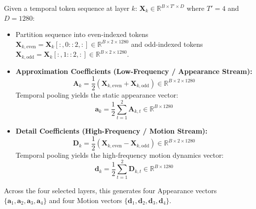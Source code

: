 \documentclass[a4paper, 11pt]{article}
\begin{document}
Given a temporal token sequence at layer $k$: $\mathbf{X}_k \in \mathbb{R}^{B \times T' \times D}$ where $T'=4$ and $D=1280$:
\begin{itemize}
    \item Partition sequence into even-indexed tokens $\mathbf{X}_{k, \text{even}} = \mathbf{X}_k[:, 0::2, :] \in \mathbb{R}^{B \times 2 \times 1280}$ and odd-indexed tokens $\mathbf{X}_{k, \text{odd}} = \mathbf{X}_k[:, 1::2, :] \in \mathbb{R}^{B \times 2 \times 1280}$.
    \item \textbf{Approximation Coefficients (Low-Frequency / Appearance Stream):}
    \begin{equation}
        \mathbf{A}_k = \frac{1}{2}(\mathbf{X}_{k, \text{even}} + \mathbf{X}_{k, \text{odd}}) \in \mathbb{R}^{B \times 2 \times 1280}
    \end{equation}
    Temporal pooling yields the static appearance vector:
    \begin{equation}
        \mathbf{a}_k = \frac{1}{2} \sum_{t=1}^{2} \mathbf{A}_{k, t} \in \mathbb{R}^{B \times 1280}
    \end{equation}
    \item \textbf{Detail Coefficients (High-Frequency / Motion Stream):}
    \begin{equation}
        \mathbf{D}_k = \frac{1}{2}(\mathbf{X}_{k, \text{even}} - \mathbf{X}_{k, \text{odd}}) \in \mathbb{R}^{B \times 2 \times 1280}
    \end{equation}
    Temporal pooling yields the high-frequency motion dynamics vector:
    \begin{equation}
        \mathbf{d}_k = \frac{1}{2} \sum_{t=1}^{2} \mathbf{D}_{k, t} \in \mathbb{R}^{B \times 1280}
    \end{equation}
\end{itemize}
Across the four selected layers, this generates four Appearance vectors $\{\mathbf{a}_1, \mathbf{a}_2, \mathbf{a}_3, \mathbf{a}_4\}$ and four Motion vectors $\{\mathbf{d}_1, \mathbf{d}_2, \mathbf{d}_3, \mathbf{d}_4\}$.
\end{document}
